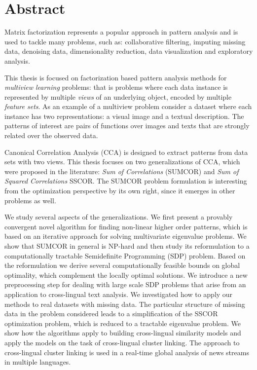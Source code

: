 %
\chapter*{Abstract}

Matrix factorization represents a popular approach in pattern analysis and
is used to tackle many problems, such as: collaborative filtering, imputing
missing data, denoising data, dimensionality reduction, data visualization and
exploratory analysis.

This thesis is focused on factorization based pattern analysis methods
for \emph{multiview learning} problems:
that is problems where each data instance is represented by multiple \emph{views} of an underlying
object, encoded by multiple \emph{feature sets}.
As an example of a multiview problem consider a dataset where each instance has two representations: a visual
image and a textual description. The patterns of interest are pairs of functions over images and texts
that are strongly related over the observed data.

Canonical Correlation Analysis (CCA) is designed to extract patterns from data sets
with two views. This thesis focuses on two generalizations of CCA, which were proposed
in the literature: \emph{Sum of Correlations} (SUMCOR) and \emph{Sum of Squared Correlations} SSCOR.
The SUMCOR problem formulation is interesting from the optimization perspective by its own right,
since it emerges in other problems as well.

We study several aspects of the generalizations. We first present a provably convergent novel algorithm
for finding non-linear higher order patterns, which is based on an iterative approach for solving
multivariate eigenvalue problems. We show that SUMCOR in general is NP-hard and then study
its reformulation to a computationally tractable Semidefinite Programming (SDP) problem. Based
on the reformulation we derive several computationally feasible bounds on global optimality,
which complement the locally optimal solutions. We introduce a new preprocessing step
for dealing with large scale SDP problems that arise from an application to cross-lingual
text analysis. We investigated how to apply our methods to real datasets with missing data.
The particular structure of missing data in the problem considered leads to a simplification of the SSCOR
optimization problem, which is reduced to a tractable eigenvalue problem. We show how
the algorithms apply to building cross-lingual similarity models and apply the models on the task
of cross-lingual cluster linking. The approach to cross-lingual cluster linking is used
in a real-time global analysis of news streams in multiple languages. 